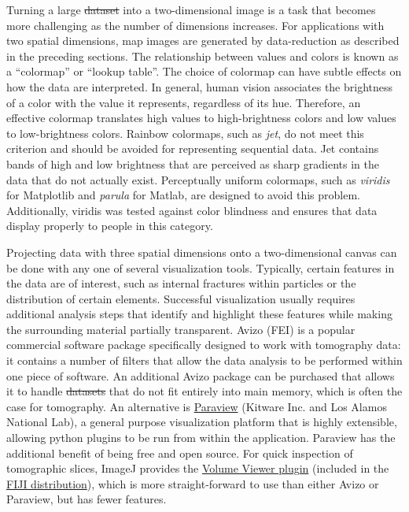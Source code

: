 \documentclass[journal=cmatex,manuscript=perspective]{achemso}
\providecommand{\DIFaddtex}[1]{{\protect\color{blue}\uwave{#1}}} %
\providecommand{\DIFdeltex}[1]{{\protect\color{red}\sout{#1}}}                      %
\providecommand{\DIFaddbegin}{} %
\providecommand{\DIFaddend}{} %
\providecommand{\DIFdelbegin}{} %
\providecommand{\DIFdelend}{} %
\providecommand{\DIFadd}[1]{\texorpdfstring{\DIFaddtex{#1}}{#1}} %
\providecommand{\DIFdel}[1]{\texorpdfstring{\DIFdeltex{#1}}{}} %
\begin{document}
Turning a large \DIFdelbegin \DIFdel{dataset }\DIFdelend \DIFaddbegin \DIFadd{data-set }\DIFaddend into a two-dimensional image is a task that
becomes more challenging as the number of dimensions increases. For
applications with two spatial dimensions, map images are generated by
data-reduction as described in the preceding sections. The
relationship between values and colors is known as a ``colormap'' or
``lookup table''. The choice of colormap can have subtle effects on
how the data are interpreted. In general, human vision associates the
brightness of a color with the value it represents, regardless of its
hue. Therefore, an effective colormap translates high values to
high-brightness colors and low values to low-brightness
colors. Rainbow colormaps, such as \emph{jet}, do not meet this
criterion and should be avoided for representing sequential data. Jet
contains bands of high and low brightness that are perceived as sharp
gradients in the data that do not actually exist. Perceptually uniform
colormaps, such as \emph{viridis} for Matplotlib and \emph{parula} for
Matlab, are designed to avoid this problem. Additionally, viridis was
tested against color blindness and ensures that data display properly
to people in this category.

Projecting data with three spatial dimensions onto a two-dimensional
canvas can be done with any one of several visualization
tools. Typically, certain features in the data are of interest, such
as internal fractures within particles or the distribution of certain
elements. Successful visualization usually requires additional
analysis steps that identify and highlight these features while making
the surrounding material partially transparent. Avizo (FEI) is a
popular commercial software package specifically designed to work with
tomography data: it contains a number of filters that allow the data
analysis to be performed within one piece of software. An additional
Avizo package can be purchased that allows it to handle \DIFdelbegin \DIFdel{datasets }\DIFdelend \DIFaddbegin \DIFadd{data-sets }\DIFaddend that
do not fit entirely into main memory, which is often the case for
tomography. An alternative is
\href{http://www.paraview.org/}{Paraview} (Kitware Inc. and Los Alamos
National Lab), a general purpose visualization platform that is highly
extensible, allowing python plugins to be run from within the
application. Paraview has the additional benefit of being free and
open source. For quick inspection of tomographic slices, ImageJ
provides the
\href{https://imagej.nih.gov/ij/plugins/volume-viewer.html}{Volume
  Viewer plugin} (included in the \href{http://imagej.net/Fiji}{FIJI
  distribution}), which is more straight-forward to use than either
Avizo or Paraview, but has fewer features.
\end{document}
